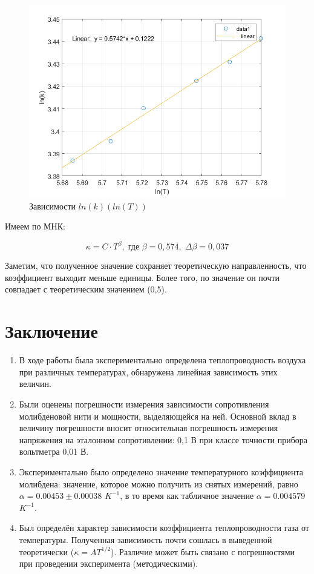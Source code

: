 \documentclass[a4paper, 12pt]{article} %
\begin{document}
\begin{figure}[!h]
    \centering
    \includegraphics[width = 13 cm]{lnKT.png}
    \caption{Зависимости $ln(k)(ln(T))$}
    \label{fig:vac}
\end{figure}


Имеем по МНК:

\begin{equation}
    \kappa = C \cdot T^{\beta}, \;  \text{где } \beta = 0,574, \; \Delta \beta = 0,037
\end{equation}

Заметим, что полученное значение сохраняет теоретическую направленность, что коэффициент выходит меньше единицы. Более того, по значение он почти совпадает с теоретическим значением (0,5). 


\section{Заключение}

\begin{enumerate}

    \item В ходе работы была экспериментально определена теплопроводность воздуха при различных температурах, обнаружена линейная зависимость этих величин.
    \item Были оценены погрешности измерения зависимости сопротивления молибденовой нити и мощности, выделяющейся на ней. Основной вклад в величину погрешности вносит относительная погрешность измерения напряжения на эталонном сопротивлении: 0,1 В при классе точности прибора вольтметра 0,01 В.
    \item Экспериментально было определено значение температурного коэффициента молибдена: значение, которое можно получить из снятых измерений, равно $\alpha = 0.00453 \pm 0.00038$ $K^{-1}$, в то время как табличное значение  $\alpha = 0.004579$ $K^{-1}$.
    \item Был определён характер зависимости коэффициента теплопроводности газа от температуры. Полученная зависимость почти сошлась в выведенной теоретически ($\kappa = AT^{1/2} $). Различие может быть связано с погрешностями при проведении эксперимента (методическими).
    
\end{enumerate}
\end{document}
